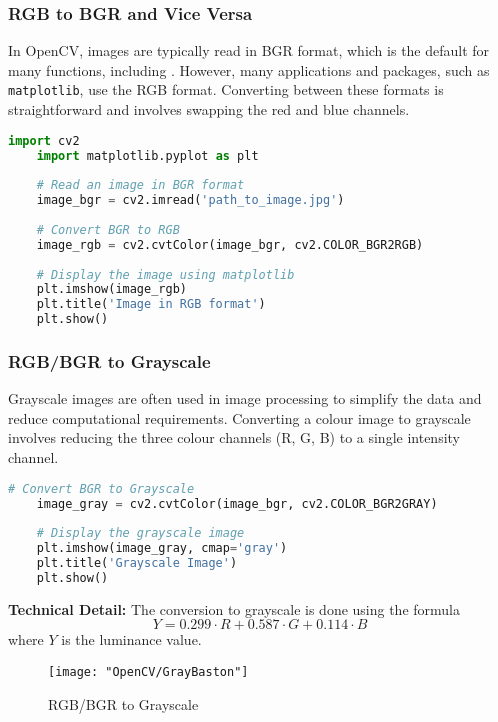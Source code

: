 \subsubsection{RGB to BGR and Vice Versa}

In OpenCV, images are typically read in BGR format, which is the default for many functions, including . However, many applications and packages, such as \texttt{matplotlib}, use the RGB format. Converting between these formats is straightforward and involves swapping the red and blue channels.\cite{Dawson:2014}

\begin{lstlisting}[language=Python, caption=Converting BGR to RGB in OpenCV]
	import cv2
	import matplotlib.pyplot as plt
	
	# Read an image in BGR format
	image_bgr = cv2.imread('path_to_image.jpg')
	
	# Convert BGR to RGB
	image_rgb = cv2.cvtColor(image_bgr, cv2.COLOR_BGR2RGB)
	
	# Display the image using matplotlib
	plt.imshow(image_rgb)
	plt.title('Image in RGB format')
	plt.show()
\end{lstlisting}

\subsubsection{RGB/BGR to Grayscale}

Grayscale images are often used in image processing to simplify the data and reduce computational requirements. Converting a colour image to grayscale involves reducing the three colour channels (R, G, B) to a single intensity channel.

\begin{lstlisting}[language=Python, caption=Converting BGR to Grayscale in OpenCV]
	# Convert BGR to Grayscale
	image_gray = cv2.cvtColor(image_bgr, cv2.COLOR_BGR2GRAY)
	
	# Display the grayscale image
	plt.imshow(image_gray, cmap='gray')
	plt.title('Grayscale Image')
	plt.show()
\end{lstlisting}

\textbf{Technical Detail:} The conversion to grayscale is done using the formula 
\[ Y = 0.299 \cdot R + 0.587 \cdot G + 0.114 \cdot B \]
where \( Y \) is the luminance value.

\begin{figure}[h]
	\centering
	\texttt{[image: "OpenCV/GrayBaston"]}
	\caption{RGB/BGR to Grayscale}\label{Grayscale Image}
\end{figure}

